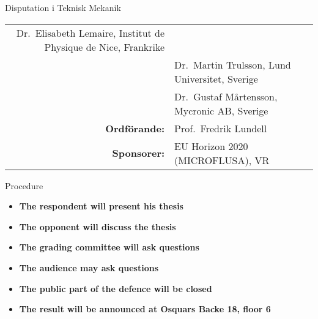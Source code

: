 \begin{frame}[plain]{Disputation i Teknisk Mekanik}
\begin{longtable}[]{@{}rl@{}}
\begin{minipage}[t]{0.72\columnwidth}
    Dr.~Elisabeth Lemaire, Institut de Physique de Nice, Frankrike\strut
  \end{minipage}\tabularnewline
  \begin{minipage}[t]{0.22\columnwidth}\raggedleft
    \strut
  \end{minipage} & \begin{minipage}[t]{0.72\columnwidth}\raggedright
    Dr.~Martin Trulsson, Lund Universitet, Sverige\strut
  \end{minipage}\tabularnewline
  \begin{minipage}[t]{0.22\columnwidth}\raggedleft
    \strut
  \end{minipage} & \begin{minipage}[t]{0.72\columnwidth}\raggedright
    Dr.~Gustaf M\aa rtensson, Mycronic AB, Sverige\strut
  \end{minipage}\tabularnewline
  \begin{minipage}[t]{0.22\columnwidth}\raggedleft
    \textbf{Ordförande:}\strut
  \end{minipage} & \begin{minipage}[t]{0.72\columnwidth}\raggedright
    Prof.~Fredrik Lundell\strut
  \end{minipage}\tabularnewline
  \begin{minipage}[t]{0.22\columnwidth}\raggedleft
    \textbf{Sponsorer:}\strut
  \end{minipage} & \begin{minipage}[t]{0.72\columnwidth}\raggedright
    EU Horizon 2020 (MICROFLUSA), VR\strut
  \end{minipage}\tabularnewline
  \bottomrule
\end{longtable}
\end{frame}

\begin{frame}[plain]{Procedure}
\protect\hypertarget{procedure}{}
\begin{itemize}
\item
  \textbf{The respondent will present his thesis}
  \medskip
\item
  \textbf{The opponent will discuss the thesis}
  \medskip
\item
  \textbf{The grading committee will ask questions}
  \medskip
\item
  \textbf{The audience may ask questions}
  \medskip
\item
  \textbf{The public part of the defence will be closed}
  \medskip
\item
  \textbf{The result will be announced at Osquars Backe 18, floor 6}
\end{itemize}
\end{frame}
